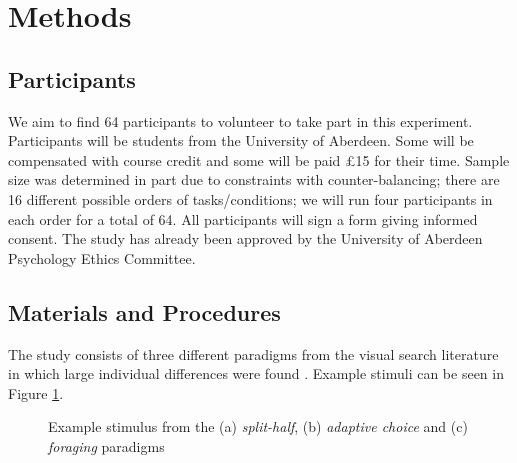\documentclass[]{rsos}%
\begin{document}
\section{Methods}


\subsection{Participants}
We aim to find 64 participants to volunteer to take part in this experiment. Participants will be students from the University of Aberdeen. Some will be compensated with course credit and some will be paid \pounds 15 for their time. Sample size was determined in part due to constraints with counter-balancing; there are 16 different possible orders of tasks/conditions; we will run four participants in each order for a total of 64. All participants will sign a form giving informed consent. The study has already been approved by the University of Aberdeen Psychology Ethics Committee.

\subsection{Materials and Procedures}

The study consists of three different paradigms from the visual search literature in which large individual differences were found \cite{nowakowsak2017, irons-leber2016, kristjansson2014}. Example stimuli can be seen in Figure \ref{fig:exampleStimuli}.

\begin{figure}
\centering
{}
\caption{Example stimulus from the (a) \textit{split-half}, (b) \textit{adaptive choice} and (c) \textit{foraging} paradigms}
\label{fig:exampleStimuli}
\end{figure}
\end{document}
